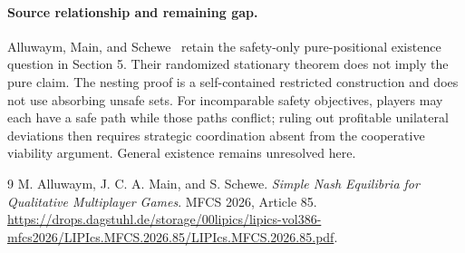 \documentclass[11pt]{article}
\theoremstyle{definition}
\theoremstyle{remark}
\begin{document}
\paragraph{Source relationship and remaining gap.}
Alluwaym, Main, and Schewe~\cite{source} retain the safety-only pure-positional existence question in Section 5. Their randomized stationary theorem does not imply the pure claim. The nesting proof is a self-contained restricted construction and does not use absorbing unsafe sets. For incomparable safety objectives, players may each have a safe path while those paths conflict; ruling out profitable unilateral deviations then requires strategic coordination absent from the cooperative viability argument. General existence remains unresolved here.

\begin{thebibliography}{9}
 M. Alluwaym, J. C. A. Main, and S. Schewe.
\emph{Simple Nash Equilibria for Qualitative Multiplayer Games}. MFCS 2026, Article 85.
\url{https://drops.dagstuhl.de/storage/00lipics/lipics-vol386-mfcs2026/LIPIcs.MFCS.2026.85/LIPIcs.MFCS.2026.85.pdf}.
\end{thebibliography}
\end{document}

